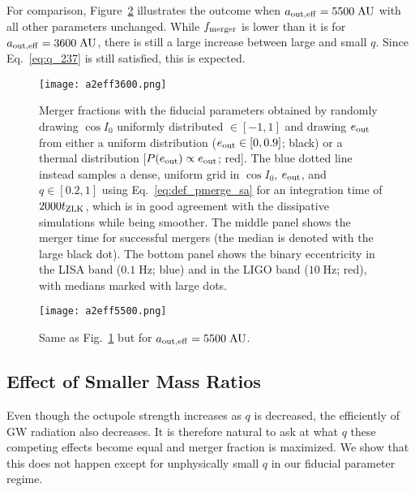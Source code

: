 \documentclass[
        fleqn,
        usenatbib,
    ]{mnras}
\begin{document}
For comparison, Figure~\ref{fig:popsynth5500} illustrates the outcome when
$a_{\rm out, eff} = 5500\;\mathrm{AU}$ with all other parameters unchanged.
While $f_{\rm merger}$ is lower than it is for $a_{\rm out, eff} =
3600\;\mathrm{AU}$, there is still a large increase between large and small $q$.
Since Eq.~\eqref{eq:q_237} is still satisfied, this is expected.
\begin{figure}
    \centering
    \texttt{[image: a2eff3600.png]}
    \caption{Merger fractions with the fiducial parameters obtained by randomly
    drawing $\cos I_0$ uniformly distributed $\in [-1, 1]$ and drawing $e_{\rm
    out}$ from either a uniform distribution ($e_{\rm out} \in [0, 0.9]$; black)
    or a thermal distribution [$P(e_{\rm out}) \propto e_{\rm out}$; red]. The
    blue dotted line instead samples a dense, uniform grid in $\cos I_0$,
    $e_{\rm out}$, and $q \in [0.2, 1]$ using Eq.~\eqref{eq:def_pmerge_sa} for
    an integration time of $2000 t_{\rm ZLK}$, which is in good agreement with
    the dissipative simulations while being smoother. The middle panel shows the
    merger time for successful mergers (the median is denoted with the large
    black dot). The bottom panel shows the binary eccentricity in the LISA band
    ($0.1\;\mathrm{Hz}$; blue) and in the LIGO band ($10 \;\mathrm{Hz}$; red),
    with medians marked with large dots. }\label{fig:popsynth}
\end{figure}
\begin{figure}
    \centering
    \texttt{[image: a2eff5500.png]}
    \caption{Same as Fig.~\ref{fig:popsynth} but for $a_{\rm out, eff} =
    5500\;\mathrm{AU}$. }\label{fig:popsynth5500}
\end{figure}

\subsection{Effect of Smaller Mass Ratios}

Even though the octupole strength increases as $q$ is decreased, the efficiently
of GW radiation also decreases. It is therefore natural to ask at what $q$ these
competing effects become equal and merger fraction is maximized. We show that
this does not happen except for unphysically small $q$ in our fiducial parameter
regime.
\end{document}
